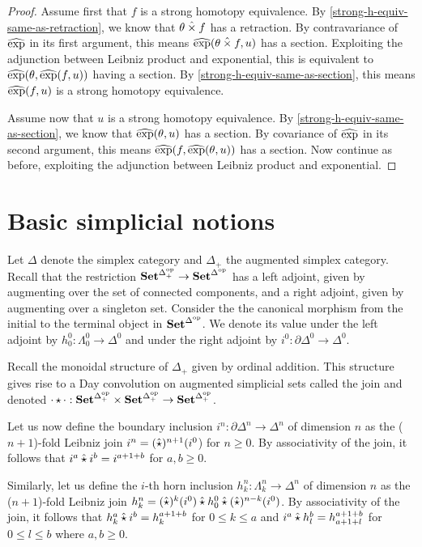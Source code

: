 \documentclass[reqno,10pt,a4paper,oneside]{amsart}
\begin{document}
\begin{proof}
Assume first that $f$ is a strong homotopy equivalence.
By \cref{strong-h-equiv-same-as-retraction}, we know that $\theta \mathbin{\hat{\times}} f$ has a retraction.
By contravariance of $\operatorname{\widehat{exp}}$ in its first argument, this means $\operatorname{\widehat{exp}}(\theta \mathbin{\hat{\times}} f, u)$ has a section.
Exploiting the adjunction between Leibniz product and exponential, this is equivalent to $\operatorname{\widehat{exp}}(\theta, \operatorname{\widehat{exp}}(f, u))$ having a section.
By \cref{strong-h-equiv-same-as-section}, this means $\operatorname{\widehat{exp}}(f, u)$ is a strong homotopy equivalence.

Assume now that $u$ is a strong homotopy equivalence.
By \cref{strong-h-equiv-same-as-section}, we know that $\operatorname{\widehat{exp}}(\theta, u)$ has a section.
By covariance of $\operatorname{\widehat{exp}}$ in its second argument, this means $\operatorname{\widehat{exp}}(f, \operatorname{\widehat{exp}}(\theta, u))$ has a section.
Now continue as before, exploiting the adjunction between Leibniz product and exponential.
\end{proof}

\section{Basic simplicial notions}

Let $\Delta$ denote the simplex category and $\Delta_+$ the augmented simplex category.
Recall that the restriction $\mathbf{Set}^{\Delta_+^{\mathrm{op}}} \to \mathbf{Set}^{\Delta^{\mathrm{op}}}$ has a left adjoint, given by augmenting over the set of connected components, and a right adjoint, given by augmenting over a singleton set.
Consider the the canonical morphism from the initial to the terminal object in $\mathbf{Set}^{\Delta^{\mathrm{op}}}$.
We denote its value under the left adjoint by $h_0^0 : \Lambda_0^0 \to \Delta^0$ and under the right adjoint by $i^0 : \partial \Delta^0 \to \Delta^0$.

Recall the monoidal structure of $\Delta_+$ given by ordinal addition.
This structure gives rise to a Day convolution on augmented simplicial sets called the join and denoted $\mathop{\cdot} \star \mathop{\cdot} : \mathbf{Set}^{\Delta_+^{\mathrm{op}}} \times \mathbf{Set}^{\Delta_+^{\mathrm{op}}} \to \mathbf{Set}^{\Delta_+^{\mathrm{op}}}$.

Let us now define the boundary inclusion $i^n : \partial \Delta^n \to \Delta^n$ of dimension $n$ as the ($n+1$)-fold Leibniz join $i^n = (\mathbin{\hat{\star}})^{n+1}(i^0$) for $n \geq 0$.
By associativity of the join, it follows that $i^a \mathbin{\hat{\star}} i^b = i^{a+1+b}$ for $a, b \geq 0$.

Similarly, let us define the $i$-th horn inclusion $h_k^n : \Lambda_k^n \to \Delta^n$ of dimension $n$ as the ($n+1$)-fold Leibniz join $h_k^n = (\mathbin{\hat{\star}})^k(i^0) \mathbin{\hat{\star}} h_0^0 \mathbin{\hat{\star}} (\mathbin{\hat{\star}})^{n-k}(i^0)$.
By associativity of the join, it follows that $h_k^a \mathbin{\hat{\star}} i^b = h_k^{a+1+b}$ for $0 \leq k \leq a$ and $i^a \mathbin{\hat{\star}} h_l^b = h_{a+1+l}^{a+1+b}$ for $0 \leq l \leq b$ where $a, b \geq 0$.
\end{document}
